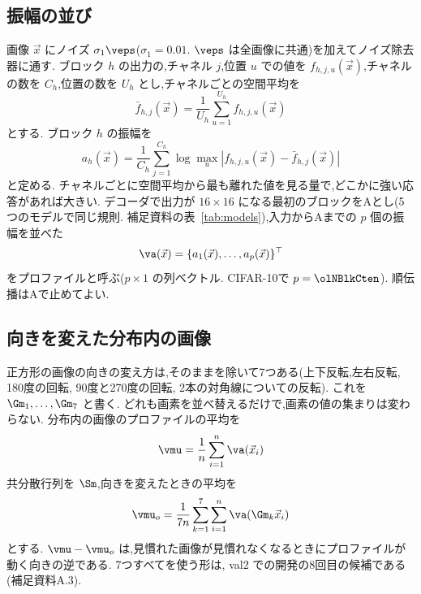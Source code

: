 \subsection{振幅の並び}
\label{sec:amp}
画像 $\vec{x}$ にノイズ $\sigma_1\veps$($\sigma_1=0.01$. $\veps$ は全画像に共通)を加えてノイズ除去器に通す. ブロック $h$ の出力の,チャネル $j$,位置 $u$ での値を $f_{h,j,u}(\vec{x})$,チャネルの数を $C_h$,位置の数を $U_h$ とし,チャネルごとの空間平均を
\begin{equation}
\bar{f}_{h,j}(\vec{x})=\frac{1}{U_h}\sum_{u=1}^{U_h}f_{h,j,u}(\vec{x})
\label{eq:fbar}
\end{equation}
とする. ブロック $h$ の振幅を
\begin{equation}
a_h(\vec{x})=\frac{1}{C_h}\sum_{j=1}^{C_h}\log\max_{u}|f_{h,j,u}(\vec{x})-\bar{f}_{h,j}(\vec{x})|
\label{eq:amp}
\end{equation}
と定める. チャネルごとに空間平均から最も離れた値を見る量で,どこかに強い応答があれば大きい. デコーダで出力が $16{\times}16$ になる最初のブロックをAとし(5つのモデルで同じ規則. 補足資料の表~\ref{tab:models}),入力からAまでの $p$ 個の振幅を並べた
\begin{equation}
\va(\vec{x})=\{a_1(\vec{x}),\dots,a_p(\vec{x})\}^{\top}
\label{eq:profile}
\end{equation}
をプロファイルと呼ぶ($p\times 1$ の列ベクトル. CIFAR-10で $p=\olNBlkCten$). 順伝播はAで止めてよい.

\subsection{向きを変えた分布内の画像}
\label{sec:orient}
正方形の画像の向きの変え方は,そのままを除いて7つある(上下反転,左右反転, 180度の回転, 90度と270度の回転, 2本の対角線についての反転). これを $\Gm_1,\dots,\Gm_7$ と書く. どれも画素を並べ替えるだけで,画素の値の集まりは変わらない. 分布内の画像のプロファイルの平均を
\begin{equation}
\vmu=\frac{1}{n}\sum_{i=1}^{n}\va(\vec{x}_i)
\label{eq:mu}
\end{equation}
共分散行列を $\Sm$,向きを変えたときの平均を
\begin{equation}
\vmu_{o}=\frac{1}{7n}\sum_{k=1}^{7}\sum_{i=1}^{n}\va(\Gm_k\vec{x}_i)
\label{eq:muo}
\end{equation}
とする. $\vmu-\vmu_{o}$ は,見慣れた画像が見慣れなくなるときにプロファイルが動く向きの逆である. 7つすべてを使う形は, val2 での開発の8回目の候補である(補足資料A.3).

